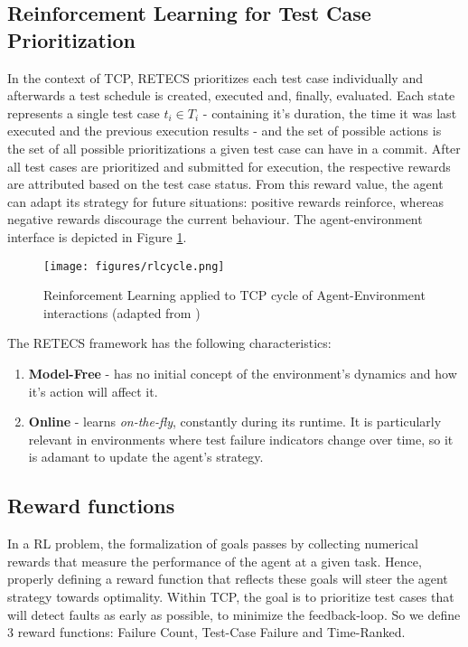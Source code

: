 \subsection{Reinforcement Learning for Test Case Prioritization}


In the context of TCP, RETECS prioritizes each test case individually and afterwards a test schedule is created, executed and, finally, evaluated. Each state represents a single test case $t_i \in T_i$ - containing it's duration, the time it was last executed and the previous execution results -  and the set of possible actions is the set of all possible prioritizations a given test case can have in a commit. After all test cases are prioritized and submitted for execution, the respective rewards are attributed based on the test case status. From this reward value, the agent can adapt its strategy for future situations: positive rewards reinforce, whereas negative rewards discourage the current behaviour. The agent-environment interface is depicted in Figure \ref{rlcycle}.

\begin{figure}[h]
	\centering
	\texttt{[image: figures/rlcycle.png]}
	\caption{Reinforcement Learning applied to TCP cycle of Agent-Environment interactions (adapted from \cite{rlintro})}
	\label{rlcycle}
\end{figure}

The RETECS framework has the following characteristics: 

\begin{enumerate}
	\item \textbf{Model-Free} - has no initial concept of the environment's dynamics and how it's action will affect it.
	\item \textbf{Online} - learns \textit{on-the-fly}, constantly during its runtime. It is particularly relevant in environments where test failure indicators change over time, so it is adamant to update the agent's strategy.
\end{enumerate}


\subsection{Reward functions}

In a RL problem, the formalization of goals passes by collecting numerical rewards that measure the performance of the agent at a given task. Hence, properly defining a reward function that reflects these goals will steer the agent strategy towards optimality. Within TCP, the goal is to prioritize test cases that will detect faults as early as possible, to minimize the feedback-loop. So we define 3 reward functions: Failure Count, Test-Case Failure and Time-Ranked. 

